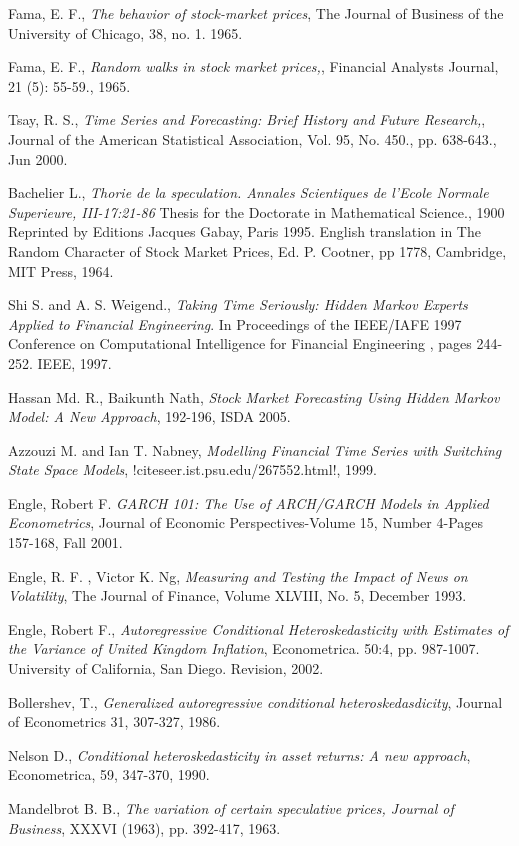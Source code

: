 \begin{thebibliography}{99}
 Fama, E. F.,
  {\em The behavior of stock-market prices},
  The Journal of Business of the University of Chicago, 38, no. 1.
  1965.

 Fama, E. F.,
  {\em Random walks in stock market prices,},
  Financial Analysts Journal, 21 (5): 55-59.,
  1965.
  
 Tsay, R. S.,
  {\em Time Series and Forecasting: Brief History and Future Research,},
  Journal of the American Statistical Association, Vol. 95, No. 450., pp. 638-643.,
  Jun 2000.

 Bachelier L.,
  {\em Thorie de la speculation. Annales Scientiques de l'Ecole Normale Superieure, III-17:21-86}
  Thesis for the Doctorate in Mathematical Science., 1900
  Reprinted by Editions Jacques Gabay, Paris 1995. English
  translation in The Random Character of Stock Market Prices, Ed. P. Cootner, pp
  1778, Cambridge, MIT Press, 1964.

 Shi S. and A. S. Weigend., {\em Taking Time Seriously: Hidden
  Markov Experts Applied to Financial Engineering}. In Proceedings of the
  IEEE/IAFE 1997 Conference on Computational Intelligence for Financial
  Engineering , pages 244-252. IEEE, 
  1997.

 Hassan Md. R., Baikunth Nath, 
  {\em Stock Market Forecasting Using Hidden Markov Model: A New Approach},
  192-196, 
  ISDA 2005.

 Azzouzi M.  and Ian T. Nabney,
  {\em Modelling Financial Time Series with Switching State Space Models},
  \PVerb!citeseer.ist.psu.edu/267552.html!,
  1999.
  
 Engle, Robert F. 
  {\em GARCH 101: The Use of ARCH/GARCH Models in Applied Econometrics},
  Journal of Economic Perspectives-Volume 15, Number 4-Pages 157-168, Fall
  2001. 
  
 Engle, R. F. , Victor K. Ng,  
  {\em Measuring and Testing the Impact of News on Volatility},
  The Journal of Finance, Volume XLVIII, No. 5, 
  December 1993.
  
 Engle, Robert F., {\em Autoregressive Conditional
  Heteroskedasticity with Estimates of the Variance of United Kingdom
  Inflation}, Econometrica. 50:4, pp. 987-1007. University of California, San
  Diego. Revision,
  2002.

 Bollershev, T.,
  {\em Generalized autoregressive conditional heteroskedasdicity}, Journal of
  Econometrics 31, 307-327,
  1986.
  
 Nelson D., 
  {\em Conditional heteroskedasticity in asset returns: A new approach},
  Econometrica, 59, 347-370, 
  1990.
    
 Mandelbrot B. B., 
  {\em The variation of certain speculative prices, Journal of Business},
  XXXVI (1963), pp. 392-417, 
  1963.

  
\end{thebibliography}


